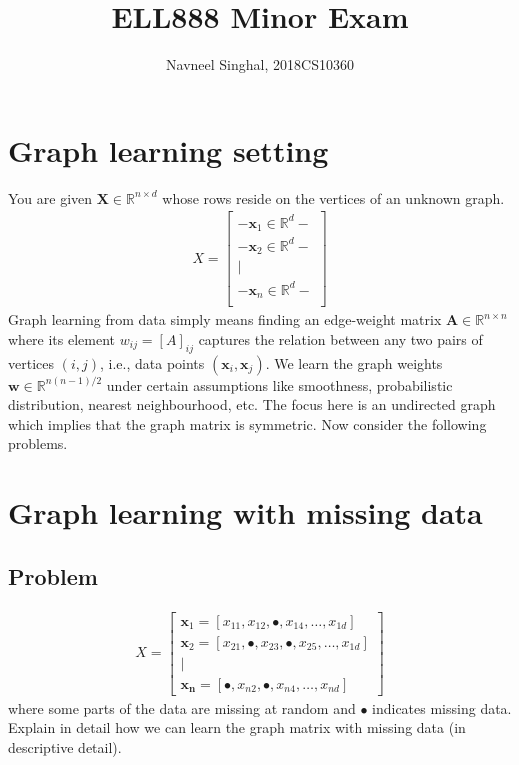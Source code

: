 \documentclass[a4paper]{article}
\title{\textbf{ELL888 Minor Exam}}
\author{Navneel Singhal, 2018CS10360}
\date{}
\newcommand{\mf}{\mathbf}
\newcommand{\R}{\mathbb{R}}
\begin{document}
\maketitle
\tableofcontents

\setcounter{section}{-1}

\section{Graph learning setting}

You are given $\mf{X} \in \R^{n \times d}$ whose rows reside on the vertices of an unknown graph.
\begin{align*}
    X = \begin{bmatrix}
        - \mf{x}_1 \in \R^d -\\
        - \mf{x}_2 \in \R^d -\\
            \mid \\
        - \mf{x}_n \in \R^d -\\
    \end{bmatrix}
\end{align*}
Graph learning from data simply means finding an edge-weight matrix $\mf{A} \in \R^{n \times n}$ where its element $w_{ij} = {[A]}_{ij}$ captures the relation between any two pairs of vertices $(i,
j)$, i.e., data points $(\mf{x}_i, \mf{x}_j)$. We learn the graph weights $\mf{w} \in \R^{n(n - 1)/2}$ under certain assumptions like smoothness, probabilistic distribution, nearest
neighbourhood, etc. The focus here is an undirected graph which implies that the graph matrix is symmetric. Now consider the following problems.

\section{Graph learning with missing data}

\subsection{Problem}
\begin{align*}
    X = \begin{bmatrix}
        \mf{x}_1 = [x_{11}, x_{12}, \bullet, x_{14}, \ldots, x_{1d}]\\
        \mf{x}_2 = [x_{21}, \bullet, x_{23}, \bullet, x_{25}, \ldots, x_{1d}]\\
        \mid\\
        \mf{x_n} = [\bullet, x_{n2}, \bullet, x_{n4}, \ldots, x_{nd}]
    \end{bmatrix}
\end{align*}
where some parts of the data are missing at random and $\bullet$ indicates missing data. Explain in detail how we can learn the graph matrix with missing data (in descriptive detail).
\end{document}
